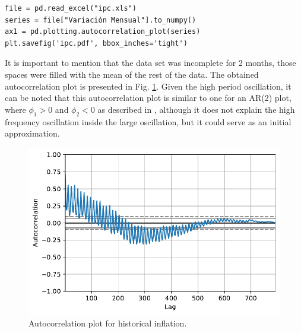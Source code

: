 \documentclass[fleqn]{article}
\begin{document}
\begin{enumerate}
\begin{verbatim}
file = pd.read_excel("ipc.xls")
series = file["Variación Mensual"].to_numpy()
ax1 = pd.plotting.autocorrelation_plot(series)
plt.savefig('ipc.pdf', bbox_inches='tight')
\end{verbatim}
It is important to mention that the data set was incomplete for 2 months, those spaces were filled with the mean of the rest of the data. The obtained autocorrelation plot is presented in Fig. \ref{fig:autcorr}. Given the high period oscillation, it can be noted that this autocorrelation plot is similar to one for an AR(2) plot, where $\phi_1>0$ and $\phi_2<0$ as described in \cite{pena2005analisis}, although it does not explain the high frequency oscillation inside the large oscillation, but it could serve as an initial approximation.
\begin{figure}[H]
    \centering
    \includegraphics[scale=0.7]{figs/ipc.pdf}
    \caption{Autocorrelation plot for historical inflation.}
    \label{fig:autcorr}
\end{figure}

\end{enumerate}


\end{document}

